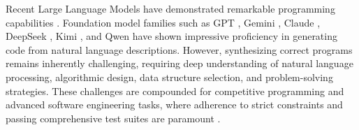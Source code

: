 \documentclass[11pt]{article}
\begin{document}
Recent Large Language Models have demonstrated remarkable programming capabilities \citep{ge2025surveyvibecodinglarge}. Foundation model families such as GPT \citep{achiam2023gpt}, Gemini \citep{team2023gemini}, Claude \citep{anthropic2024claude3}, DeepSeek \citep{liu2025deepseek}, Kimi \citep{team2025kimi}, and Qwen \citep{yang2025qwen3} have shown impressive proficiency in generating code from natural language descriptions. However, synthesizing correct programs remains inherently challenging, requiring deep understanding of natural language processing, algorithmic design, data structure selection, and problem-solving strategies. These challenges are compounded for competitive programming and advanced software engineering tasks, where adherence to strict constraints and passing comprehensive test suites are paramount \citep{chen2021evaluating, hendrycks2021measuring, li2022competition, jimenez2023swe, jain2024livecodebench}.
\end{document}
